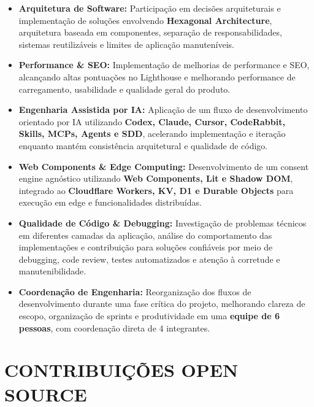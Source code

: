 \documentclass[10pt,a4paper]{article}
\begin{document}
\begin{itemize}
    \item
    \textbf{Arquitetura de Software:}
    Participação em decisões arquiteturais e implementação de
    soluções envolvendo \textbf{Hexagonal Architecture},
    arquitetura baseada em componentes, separação de responsabilidades,
    sistemas reutilizáveis e limites de aplicação manuteníveis.

    \item
    \textbf{Performance \& SEO:}
    Implementação de melhorias de performance e SEO, alcançando
    altas pontuações no Lighthouse e melhorando performance de
    carregamento, usabilidade e qualidade geral do produto.

    \item
    \textbf{Engenharia Assistida por IA:}
    Aplicação de um fluxo de desenvolvimento orientado por IA utilizando
    \textbf{Codex, Claude, Cursor, CodeRabbit, Skills, MCPs,
    Agents e SDD}, acelerando implementação e iteração enquanto
    mantém consistência arquitetural e qualidade de código.

    \item
    \textbf{Web Components \& Edge Computing:}
    Desenvolvimento de um consent engine agnóstico utilizando
    \textbf{Web Components, Lit e Shadow DOM}, integrado ao
    \textbf{Cloudflare Workers, KV, D1 e Durable Objects}
    para execução em edge e funcionalidades distribuídas.

    \item
    \textbf{Qualidade de Código \& Debugging:}
    Investigação de problemas técnicos em diferentes camadas da
    aplicação, análise do comportamento das implementações e
    contribuição para soluções confiáveis por meio de debugging,
    code review, testes automatizados e atenção à corretude e
    manutenibilidade.

    \item
    \textbf{Coordenação de Engenharia:}
    Reorganização dos fluxos de desenvolvimento durante uma fase
    crítica do projeto, melhorando clareza de escopo, organização
    de sprints e produtividade em uma \textbf{equipe de 6 pessoas},
    com coordenação direta de 4 integrantes.

\end{itemize}


\section*{CONTRIBUIÇÕES OPEN SOURCE}
\end{document}
